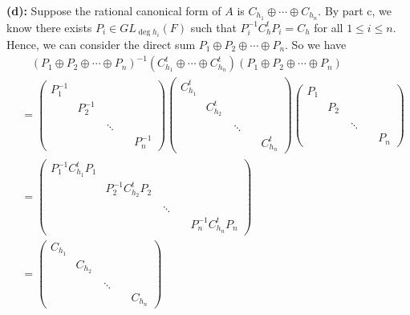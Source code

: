 \documentclass[12pt]{amsart}
\begin{document}
\textbf{(d): } Suppose the rational canonical form of $A$ is $C_{h_1}\oplus \cdots \oplus C_{h_n}$. By part c, we know there exists $P_i\in GL_{\deg h_i}(F)$ such that $P_i^{-1}C_h^tP_i=C_h$ for all $1\leq i\leq n$. Hence, we can consider the direct sum $P_1\oplus P_2\oplus \cdots\oplus P_n$.
So we have 
\begin{align*}
    &\ \ \ \ (P_1\oplus P_2\oplus \cdots\oplus P_n)^{-1}(C_{h_1}^t\oplus \cdots \oplus C_{h_n}^t)(P_1\oplus P_2\oplus \cdots\oplus P_n) \\
    &=\begin{pmatrix}
        P_1^{-1}&\ &\ &\ &\ \\
        \ & P_2^{-1} &\ &\ &\ \\
        \\
        &\ &\ \ddots\\
        \ &\ &\ &\ &P_n^{-1}
    \end{pmatrix}\begin{pmatrix}
        C_{h_1}^{t}&\ &\ &\ &\ \\
        \ & C_{h_2}^{t} &\ &\ &\ \\
        \\
        &\ &\ \ddots\\
        \ &\ &\ &\ &C_{h_n}^{t}
    \end{pmatrix}\begin{pmatrix}
        P_1&\ &\ &\ &\ \\
        \ & P_2 &\ &\ &\ \\
        \\
        &\ &\ \ddots\\
        \ &\ &\ &\ &P_n
    \end{pmatrix}\\
    &=\begin{pmatrix}
        P_1^{-1}C_{h_1}^tP_1&\ &\ &\ &\ \\
        \ & P_2^{-1}C_{h_2}^tP_2 &\ &\ &\ \\
        \\
        &\ &\ \ddots\\
        \ &\ &\ &\ &P_n^{-1}C_{h_n}^tP_n
    \end{pmatrix}\\
    &=\begin{pmatrix}
        C_{h_1}&\ &\ &\ &\ \\
        \ & C_{h_2} &\ &\ &\ \\
        \\
        &\ &\ \ddots\\
        \ &\ &\ &\ &C_{h_n}
    \end{pmatrix}
\end{align*}
\end{document}
